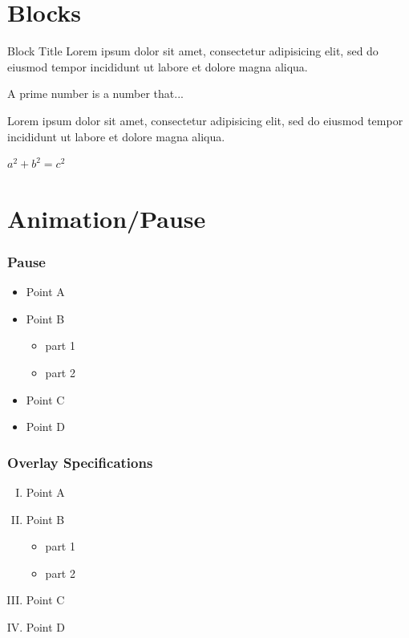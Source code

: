 \documentclass{beamer}
\begin{document}
\section{Blocks}

\begin{frame}
\begin{block}{Block Title}
Lorem ipsum dolor sit amet, consectetur adipisicing elit, 
sed do eiusmod tempor incididunt ut labore et 
dolore magna aliqua.
\end{block}
\begin{definition}
A prime number is a number that...
\end{definition}
\begin{example}
Lorem ipsum dolor sit amet, consectetur adipisicing elit, 
sed do eiusmod tempor incididunt ut labore et
dolore magna aliqua.
\end{example}
\begin{theorem}[Pythagoras] 
$ a^2 + b^2 = c^2$
\end{theorem}
\end{frame}

\section{Animation/Pause}

\begin{frame}
\frametitle{Pause}
\begin{itemize}
\pause
\item Point A
\pause
\item Point B
\begin{itemize}
\pause
\item part 1
\pause
\item part 2
\end{itemize}
\pause
\item Point C
\pause
\item Point D
\end{itemize}
\end{frame}

\begin{frame}
\frametitle{Overlay Specifications}
\begin{enumerate}[(I)]
\item<1-> Point A
\item<2-> Point B
\begin{itemize}
\item<3-> part 1
\item<4-> part 2
\end{itemize}
\item<5-> Point C
\item<6-> Point D
\end{enumerate}
\end{frame}
\end{document}
